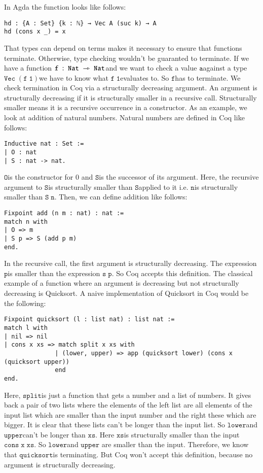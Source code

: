 \documentclass[a4paper,cleardoubleempty,BCOR1cm]{scrbook}
\begin{document}
In Agda the function looks like follows:
\begin{verbatim}
hd : {A : Set} {k : ℕ} → Vec A (suc k) → A
hd (cons x _) = x
\end{verbatim}
That types can depend on terms makes it necessary to ensure that functions
\linebreak terminate. Otherwise, type checking wouldn't be guaranted to terminate. If we have a
function \linebreak $\mathtt{f\;:\;Nat\;\rightarrowtriangle\;Nat}$\;and we want to check a value $\mathtt{a}$\;against a type
$\mathtt{Vec\;(f\;1)}$\;we have to know what $\mathtt{f\;1}$\;evaluates to. So $\mathtt{f}$\;has to terminate.
We check termination in Coq via a structurally decreasing argument. An argument
is structurally decreasing if it is structurally smaller in a recursive call.
Structurally smaller means it is a recursive occurrence in a constructor. As an
example, we look at addition of natural numbers. Natural numbers are defined
in Coq like follows:
\begin{verbatim}
Inductive nat : Set :=
| O : nat
| S : nat -> nat.
\end{verbatim}
$\mathtt{O}$\;is the constructor for 0 and $\mathtt{S}$\;is the successor of its argument. Here,
the recursive argument to $\mathtt{S}$\;is structurally smaller than $\mathtt{S}$\;applied to it i.e.
$\mathtt{n}$\;is structurally smaller than $\mathtt{S\;n}$. Then, we can define addition like follows:
\begin{verbatim}
Fixpoint add (n m : nat) : nat :=
match n with
| O => m
| S p => S (add p m)
end.
\end{verbatim}
In the recursive call, the first argument is structurally decreasing. The
expression $\mathtt{p}$\;is smaller than the expression $\mathtt{s\;p}$. So Coq accepts this
definition. The classical example of a function where an argument is
decreasing but not structurally decreasing is Quicksort. A naive implementation
of Quicksort in Coq would be the following:
\begin{verbatim}
Fixpoint quicksort (l : list nat) : list nat :=
match l with
| nil => nil
| cons x xs => match split x xs with
              | (lower, upper) => app (quicksort lower) (cons x (quicksort upper))
              end
end.
\end{verbatim}
Here, $\mathtt{split}$\;is just a function that gets a number and a list of numbers. It
gives back a pair of two lists where the elements of the left list are all
elements of the input list which are smaller than the input number and the
right these which are bigger. It is clear that these lists can't be longer
than the input list. So $\mathtt{lower}$\;and $\mathtt{upper}$\;can't be longer than $\mathtt{xs}$. Here
$\mathtt{xs}$\;is structurally smaller than the input $\mathtt{cons\;x\;xs}$. So $\mathtt{lower}$\;and $\mathtt{upper}$
are smaller than the input. Therefore, we know that $\mathtt{quicksort}$\;is terminating.
But Coq won't accept this definition, because no argument is structurally decreasing.
\end{document}
